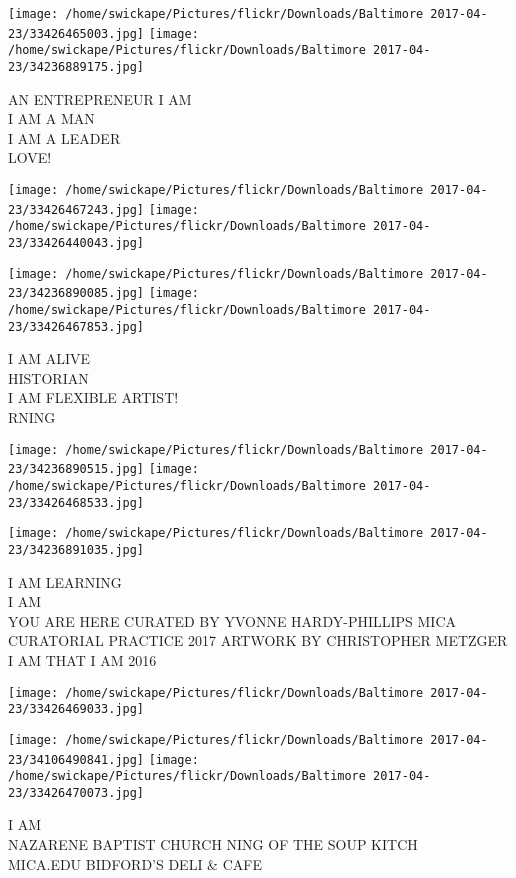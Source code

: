 \documentclass[10pt,letterpaper]{article}
\begin{document}
\texttt{[image: /home/swickape/Pictures/flickr/Downloads/Baltimore 2017-04-23/33426465003.jpg]}
\texttt{[image: /home/swickape/Pictures/flickr/Downloads/Baltimore 2017-04-23/34236889175.jpg]}

AN ENTREPRENEUR I AM\\
I AM A MAN\\
I AM A LEADER\\
LOVE!
\pagebreak

\texttt{[image: /home/swickape/Pictures/flickr/Downloads/Baltimore 2017-04-23/33426467243.jpg]}
\texttt{[image: /home/swickape/Pictures/flickr/Downloads/Baltimore 2017-04-23/33426440043.jpg]}

\texttt{[image: /home/swickape/Pictures/flickr/Downloads/Baltimore 2017-04-23/34236890085.jpg]}
\texttt{[image: /home/swickape/Pictures/flickr/Downloads/Baltimore 2017-04-23/33426467853.jpg]}

I AM ALIVE\\
HISTORIAN\\
I AM FLEXIBLE ARTIST!\\
RNING
\pagebreak

\texttt{[image: /home/swickape/Pictures/flickr/Downloads/Baltimore 2017-04-23/34236890515.jpg]}
\texttt{[image: /home/swickape/Pictures/flickr/Downloads/Baltimore 2017-04-23/33426468533.jpg]}

\texttt{[image: /home/swickape/Pictures/flickr/Downloads/Baltimore 2017-04-23/34236891035.jpg]}

I AM LEARNING\\
I AM\\
YOU ARE HERE CURATED BY YVONNE HARDY{-}PHILLIPS MICA CURATORIAL PRACTICE 2017 ARTWORK BY CHRISTOPHER METZGER I AM THAT I AM 2016
\pagebreak

\texttt{[image: /home/swickape/Pictures/flickr/Downloads/Baltimore 2017-04-23/33426469033.jpg]}

\vspace{0.25in}
\texttt{[image: /home/swickape/Pictures/flickr/Downloads/Baltimore 2017-04-23/34106490841.jpg]}
\texttt{[image: /home/swickape/Pictures/flickr/Downloads/Baltimore 2017-04-23/33426470073.jpg]}

I AM\\
NAZARENE BAPTIST CHURCH NING OF THE SOUP KITCH\\
MICA.EDU BIDFORD'S DELI \& CAFE
\pagebreak
\end{document}
